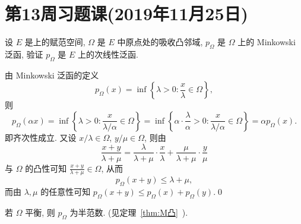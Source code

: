 \section{第13周习题课(2019年11月25日)}
	\begin{ExtraExample}
		设 $ E $ 是\R 上的赋范空间, $ \varOmega $ 是 $ E $ 中原点处的吸收凸邻域, $ p_{\varOmega} $ 是 $ \varOmega $ 上的 Minkowski 泛函, 验证 $ p_{\varOmega} $ 是 $ E $ 上的次线性泛函.
	\end{ExtraExample}
	\begin{Proof}
		由 Minkowski 泛函的定义
		\[
			p_{\varOmega}(x)=\inf\left\{ \lambda>0: \frac{x}{\lambda}\in\varOmega \right\},
		\]
		则
		\[
			p_{\varOmega}(\alpha x)=\inf\left\{ \lambda>0: \frac{x}{\lambda/\alpha}\in\varOmega \right\} = \inf\left\{ \alpha\cdot\frac{\lambda}{\alpha}>0:\frac{x}{\lambda/\alpha}\in\varOmega \right\}=\alpha p_{\varOmega}(x).
		\]
		即齐次性成立. 又设 $ x/\lambda\in\varOmega $, $ y/\mu\in\varOmega $, 则由
		\[
			\frac{x+y}{\lambda+\mu}=\frac{\lambda}{\lambda+\mu}\cdot\frac{x}{\lambda}+\frac{\mu}{\lambda+\mu}\cdot\frac{y}{\mu}
		\]
		与 $ \varOmega $ 的凸性可知 $ \frac{x+y}{\lambda+\mu}\in\varOmega $, 从而
		\[
			p_{\varOmega}(x+y)\leqslant \lambda+\mu,
		\]
		而由 $ \lambda, \mu $ 的任意性可知 $ p_{\varOmega}(x+y)\leqslant p_{\varOmega}(x)+p_{\varOmega}(y) $.\qed
	\end{Proof}
	\begin{Remark}
		若 $ \varOmega $ 平衡, 则 $ p_{\varOmega} $ 为半范数. (见定理~\ref{thm:M凸}~).
	\end{Remark}

